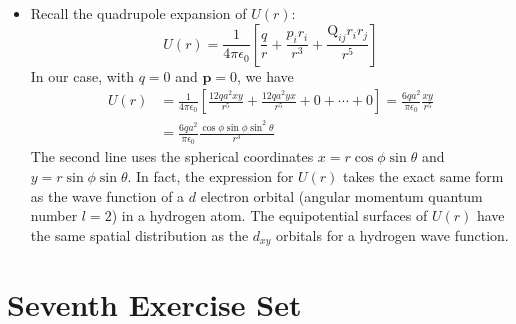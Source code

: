 \documentclass[11pt, a4paper]{article}
\renewcommand{\vec}[1]{\bm{#1}} %
\newcommand{\ee}{\epsilon_{0}}  %
\begin{document}
\begin{itemize}
	\item Recall the quadrupole expansion of $ U(r) $:
	\begin{equation*}
		U(r) = \frac{1}{4\pi \ee} \left[\frac{q}{r} + \frac{p_{i}r_{i}}{r^{3}} + \frac{\mathrm{Q}_{ij}r_{i}r_{j}}{r^{5}} \right]
	\end{equation*}
	In our case, with $ q = 0 $ and $ \vec{p} = 0 $, we have
	\begin{align*}
		U(r) &= \frac{1}{4\pi \ee} \left[\frac{12qa^{2}xy}{r^{5}} + \frac{12qa^{2}yx}{r^{5}} + 0 + \cdots + 0\right] = \frac{6qa^{2}}{\pi \ee} \frac{xy}{r^{5}}\\
		&=\frac{6qa^{2}}{\pi \ee} \frac{\cos \phi \sin \phi \sin^{2}\theta}{r^{3}}
	\end{align*}
	The second line uses the spherical coordinates $ x = r\cos \phi \sin \theta $ and $ y = r\sin \phi \sin \theta $. In fact, the expression for $ U(r) $ takes the exact same form as the wave function of a $ d $ electron orbital (angular momentum quantum number $ l = 2 $) in a hydrogen atom. The equipotential surfaces of $ U(r) $ have the same spatial distribution as the $ d_{xy} $  orbitals for a hydrogen wave function. 
	
\end{itemize}


\section{Seventh Exercise Set}
\end{document}
